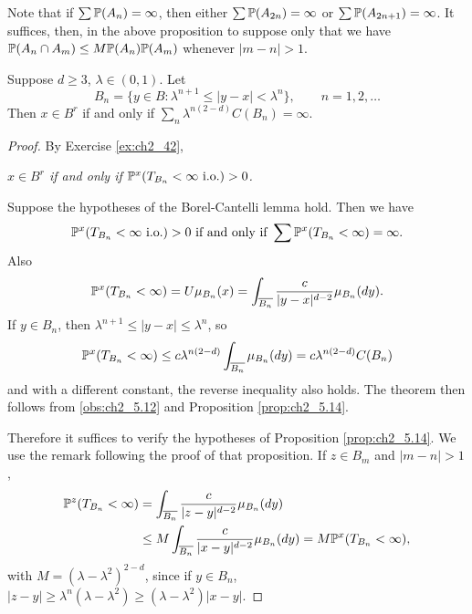 Note that if $\sum\P(A_n) = \infty$, then either $\sum\P(A_{2n}) = \infty$ or $\sum\P(A_{2n+1})\allowbreak = \infty$. It suffices, then, in the above proposition to suppose only that we have $\P(A_n \cap A_m) \leq M\P(A_n)\P(A_m)$ whenever $|m-n| > 1$.


\begin{theorem}\label{thm:ch2_5.15}
Suppose $d \geq 3$, $\lambda \in (0,1)$. Let
\[
    B_n = \{y \in B: \lambda^{n+1} \leq |y-x| < \lambda^n\}, \qquad n = 1,2,\ldots
\]
Then $x \in B^r$ if and only if $\sum_n \lambda^{n(2-d)}C(B_n) = \infty$.
\end{theorem}

\begin{proof}
By Exercise \ref{ex:ch2_42},
\begin{obs}\label{obs:ch2_5.12}
    \textit{$x \in B^r$ if and only if $\P^x(T_{B_n} < \infty~\textnormal{i.o.}) > 0$.}
\end{obs}

Suppose the hypotheses of the Borel-Cantelli lemma hold. Then we have
\[
    \P^x(T_{B_n} < \infty~\text{i.o.}) > 0~\text{if and only if}~\sum\P^x(T_{B_n} < \infty) = \infty.
\]
Also
\[
    \P^x(T_{B_n} < \infty) = U\mu_{B_n}(x) = \int_{\overline{B_n}} \frac{c}{|y-x|^{d-2}}\mu_{B_n}(dy).
\]
If $y \in B_n$, then $\lambda^{n+1} \leq |y-x| \leq \lambda^n$, so
\mpagebreak
\[
    \P^x(T_{B_n} < \infty) \leq c\lambda^{n(2-d)}\int_{\overline{B_n}} \mu_{B_n}(dy) = c\lambda^{n(2-d)}C(B_n)
\]
and with a different constant, the reverse inequality also holds. The theorem then follows from \eqref{obs:ch2_5.12} and Proposition \ref{prop:ch2_5.14}.

Therefore it suffices to verify the hypotheses of Proposition \ref{prop:ch2_5.14}. We use the remark following the proof of that proposition. If $z \in B_m$ and $|m-n| > 1$,
\begin{align*}
    \P^z(T_{B_n} < \infty) &= \int_{\overline{B_n}} \frac{c}{|z-y|^{d-2}}\mu_{B_n}(dy) \\
    &\leq M\int_{\overline{B_n}} \frac{c}{|x-y|^{d-2}}\mu_{B_n}(dy) = M\P^x(T_{B_n} < \infty),
\end{align*}
with $M = (\lambda-\lambda^2)^{2-d}$, since if $y \in B_n$, $|z-y| \geq \lambda^n(\lambda-\lambda^2) \geq (\lambda-\lambda^2)|x-y|$.


\end{proof}
